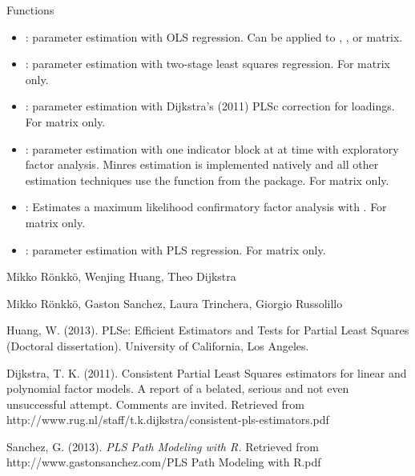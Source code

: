\documentclass[a4paper]{book}
\begin{document}
\begin{Section}{Functions}
\begin{itemize}

\item{} : parameter estimation with OLS regression. Can be applied to , ,
or  matrix.

\item{} : parameter estimation with two-stage least squares regression. For  matrix only.

\item{} : parameter estimation with Dijkstra's (2011) PLSc correction for loadings.  For  matrix only.

\item{} : parameter estimation with one indicator block at at time with exploratory
factor analysis. Minres estimation is implemented natively and all other
estimation techniques use the  function from the  package. For  matrix only.

\item{} : Estimates a maximum likelihood confirmatory factor analysis with .  For  matrix only.

\item{} : parameter estimation with PLS regression. For  matrix only.

\end{itemize}
\end{Section}
%
\begin{Author}\relax
Mikko Rönkkö, Wenjing Huang, Theo Dijkstra

Mikko Rönkkö, Gaston Sanchez, Laura Trinchera, Giorgio Russolillo
\end{Author}
%
\begin{References}\relax
Huang, W. (2013). PLSe: Efficient Estimators and Tests for Partial Least Squares (Doctoral dissertation). University of California, Los Angeles.

Dijkstra, T. K. (2011). Consistent Partial Least Squares estimators for linear and polynomial factor models. A report of a belated, serious and not even unsuccessful attempt. Comments are invited. Retrieved from http://www.rug.nl/staff/t.k.dijkstra/consistent-pls-estimators.pdf

Sanchez, G. (2013). \emph{PLS Path Modeling with R.} Retrieved from http://www.gastonsanchez.com/PLS Path Modeling with R.pdf
\end{References}
\end{document}
